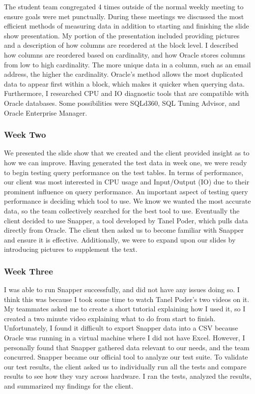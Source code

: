 \documentclass[10pt]{article}
\begin{document}
The student team congregated 4 times outside of the normal weekly meeting to ensure goals were met punctually. During these meetings we discussed the most efficient methods of measuring data in addition to starting and finishing the slide show presentation. My portion of the presentation included providing pictures and a description of how columns are reordered at the block level. I described how columns are reordered based on cardinality, and how Oracle stores columns from low to high cardinality. The more unique data in a column, such as an email address, the higher the cardinality. Oracle's method allows the most duplicated data to appear first within a block, which makes it quicker when querying data. Furthermore, I researched CPU and IO diagnostic tools that are compatible with Oracle databases. Some possibilities were SQLd360, SQL Tuning Advisor, and Oracle Enterprise Manager.

\subsubsection{Week Two}
We presented the slide show that we created and the client provided insight as to how we can improve. Having generated the test data in week one, we were ready to begin testing query performance on the test tables. In terms of performance, our client was most interested in CPU usage and Input/Output (IO) due to their prominent influence on query performance. An important aspect of testing query performance is deciding which tool to use. We know we wanted the most accurate data, so the team collectively searched for the best tool to use. Eventually the client decided to use Snapper, a tool developed by Tanel Poder, which pulls data directly from Oracle. The client then asked us to become familiar with Snapper and ensure it is effective. Additionally, we were to expand upon our slides by introducing pictures to supplement the text. 

\subsubsection{Week Three}
I was able to run Snapper successfully, and did not have any issues doing so. I think this was because I took some time to watch Tanel Poder's two videos on it. My teammates asked me to create a short tutorial explaining how I used it, so I created a two minute video explaining what to do from start to finish. Unfortunately, I found it difficult to export Snapper data into a CSV because Oracle was running in a virtual machine where I did not have Excel. However, I personally found that Snapper gathered data relevant to our needs, and the team concurred. Snapper became our official tool to analyze our test suite. To validate our test results, the client asked us to individually run all the tests and compare results to see how they vary across hardware. I ran the tests, analyzed the results, and summarized my findings for the client.
\end{document}
